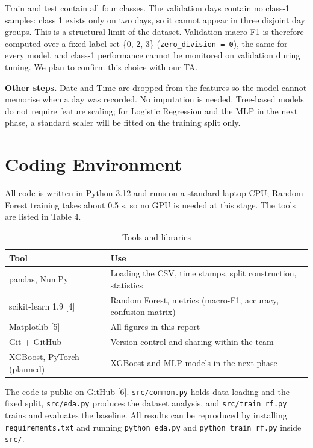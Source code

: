 \documentclass[12pt,a4paper]{article}
\begin{document}
Train and test contain all four classes. The validation days contain no class-1 samples: class 1 exists only on two days, so it cannot appear in three disjoint day groups. This is a structural limit of the dataset. Validation macro-F1 is therefore computed over a fixed label set \{0, 2, 3\} (\texttt{zero\_division = 0}), the same for every model, and class-1 performance cannot be monitored on validation during tuning. We plan to confirm this choice with our TA.

\textbf{Other steps.} Date and Time are dropped from the features so the model cannot memorise when a day was recorded. No imputation is needed. Tree-based models do not require feature scaling; for Logistic Regression and the MLP in the next phase, a standard scaler will be fitted on the training split only.

\section{Coding Environment}
All code is written in Python 3.12 and runs on a standard laptop CPU; Random Forest training takes about 0.5 s, so no GPU is needed at this stage. The tools are listed in Table 4.

\begin{table}[H]
\centering
\begin{tabular}{ll}
\toprule
\textbf{Tool} & \textbf{Use} \\
\midrule
pandas, NumPy & Loading the CSV, time stamps, split construction, statistics \\
scikit-learn 1.9 [4] & Random Forest, metrics (macro-F1, accuracy, confusion matrix) \\
Matplotlib [5] & All figures in this report \\
Git + GitHub & Version control and sharing within the team \\
XGBoost, PyTorch (planned) & XGBoost and MLP models in the next phase \\
\bottomrule
\end{tabular}
\caption{Tools and libraries}
\end{table}

The code is public on GitHub [6]. \texttt{src/common.py} holds data loading and the fixed split, \texttt{src/eda.py} produces the dataset analysis, and \texttt{src/train\_rf.py} trains and evaluates the baseline. All results can be reproduced by installing \texttt{requirements.txt} and running \texttt{python eda.py} and \texttt{python train\_rf.py} inside \texttt{src/}.
\end{document}
